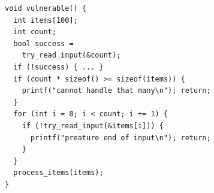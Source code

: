 \documentclass[tikz]{standalone}
\begin{document}
\begin{lrbox}{\intOverflowExCode}
\begin{lstlisting}
void vulnerable() {
  int items[100];
  int count;
  bool success =
    try_read_input(&count);
  if (!success) { ... }
  if (count * sizeof() >= sizeof(items)) {
    printf("cannot handle that many\n"); return;
  }
  for (int i = 0; i < count; i += 1) {
    if (!try_read_input(&items[i])) { 
      printf("preature end of input\n"); return;
    }
  }
  process_items(items);
}
\end{lstlisting}
\end{lrbox}


\end{document}
